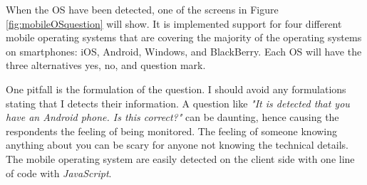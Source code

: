     When the OS have been detected, one of the screens in Figure \ref{fig:mobileOSquestion} will show. It is implemented support for four different mobile operating systems that are covering the majority of the operating systems on smartphones: iOS, Android, Windows, and BlackBerry. Each OS will have the three alternatives yes, no, and question mark. 

    One pitfall is the formulation of the question. I should avoid any formulations stating that I detects their information. A question like {\it "It is detected that you have an Android phone. Is this correct?"} can be daunting, hence causing the respondents the feeling of being monitored. The feeling of someone knowing anything about you can be scary for anyone not knowing the technical details. The mobile operating system are easily detected on the client side with one line of code with {\it JavaScript}.

